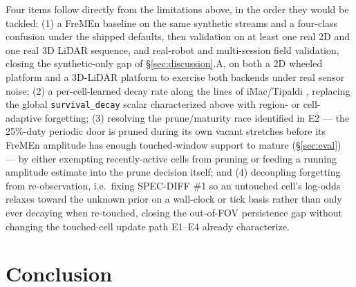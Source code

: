 \documentclass[conference]{IEEEtran}
\begin{document}
Four items follow directly from the limitations above, in the order they
would be tackled: (1) a FreMEn baseline on the same synthetic streams and a
four-class confusion under the shipped defaults, then validation on at least
one real 2D and one real 3D LiDAR sequence, and real-robot and multi-session
field validation, closing the synthetic-only gap of \S\ref{sec:discussion}.A, on both a 2D wheeled platform and a 3D-LiDAR
platform to exercise both backends under real sensor noise; (2) a
per-cell-learned decay rate along the lines of iMac/Tipaldi
\cite{saarinen2012imac,tipaldi2013lifelong}, replacing the global
\texttt{survival\_decay} scalar characterized above with region- or cell-adaptive
forgetting; (3) resolving the prune/maturity race identified in E2 --- the
25\%-duty periodic door is pruned during its own vacant stretches before its
FreMEn amplitude has enough touched-window support to mature (\S\ref{sec:eval}) --- by
either exempting recently-active cells from pruning or feeding a running
amplitude estimate into the prune decision itself; and (4) decoupling
forgetting from re-observation, i.e.\ fixing SPEC-DIFF \#1 so an
untouched cell's log-odds relaxes toward the unknown prior on a wall-clock
or tick basis rather than only ever decaying when re-touched, closing the
out-of-FOV persistence gap without changing the touched-cell update path E1--E4
already characterize.

\section{Conclusion}
\label{sec:conclusion}
\end{document}
